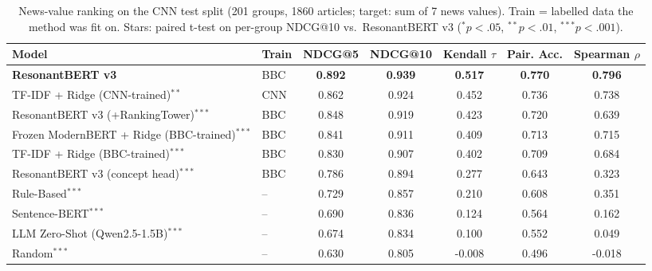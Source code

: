 \begin{table}[t]
\centering
\small
\begin{tabular}{llccccc}
\toprule
\textbf{Model} & \textbf{Train} & \textbf{NDCG@5} & \textbf{NDCG@10} & \textbf{Kendall $\tau$} & \textbf{Pair. Acc.} & \textbf{Spearman $\rho$} \\
\midrule
\textbf{ResonantBERT v3} & BBC & \textbf{0.892} & \textbf{0.939} & \textbf{0.517} & \textbf{0.770} & \textbf{0.796} \\
TF-IDF + Ridge (CNN-trained)$^{**}$ & CNN & 0.862 & 0.924 & 0.452 & 0.736 & 0.738 \\
ResonantBERT v3 (+RankingTower)$^{***}$ & BBC & 0.848 & 0.919 & 0.423 & 0.720 & 0.639 \\
Frozen ModernBERT + Ridge (BBC-trained)$^{***}$ & BBC & 0.841 & 0.911 & 0.409 & 0.713 & 0.715 \\
TF-IDF + Ridge (BBC-trained)$^{***}$ & BBC & 0.830 & 0.907 & 0.402 & 0.709 & 0.684 \\
ResonantBERT v3 (concept head)$^{***}$ & BBC & 0.786 & 0.894 & 0.277 & 0.643 & 0.323 \\
Rule-Based$^{***}$ & -- & 0.729 & 0.857 & 0.210 & 0.608 & 0.351 \\
Sentence-BERT$^{***}$ & -- & 0.690 & 0.836 & 0.124 & 0.564 & 0.162 \\
LLM Zero-Shot (Qwen2.5-1.5B)$^{***}$ & -- & 0.674 & 0.834 & 0.100 & 0.552 & 0.049 \\
Random$^{***}$ & -- & 0.630 & 0.805 & -0.008 & 0.496 & -0.018 \\
\bottomrule
\end{tabular}
\caption{News-value ranking on the CNN test split (201 groups, 1860 articles; target: sum of 7 news values). Train = labelled data the method was fit on. Stars: paired t-test on per-group NDCG@10 vs.\ ResonantBERT v3 ($^{*}p<.05$, $^{**}p<.01$, $^{***}p<.001$).}
\label{tab:cnn_v3_main}
\end{table}